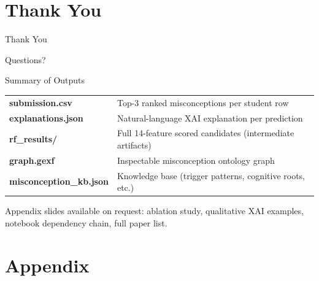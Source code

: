 ﻿\documentclass[aspectratio=169,10pt]{beamer}
\begin{document}
\section{Thank You}
\begin{frame}{Thank You}
\begin{center}
{\Large Questions?}

\vspace{1.2em}

\begin{block}{Summary of Outputs}
\begin{tabular}{ll}
\textbf{submission.csv} & Top-3 ranked misconceptions per student row\\
\textbf{explanations.json} & Natural-language XAI explanation per prediction\\
\textbf{rf\_results/} & Full 14-feature scored candidates (intermediate artifacts)\\
\textbf{graph.gexf} & Inspectable misconception ontology graph\\
\textbf{misconception\_kb.json} & Knowledge base (trigger patterns, cognitive roots, etc.)\\
\end{tabular}
\end{block}

\vspace{1em}
{\small Appendix slides available on request: ablation study, qualitative XAI examples, notebook dependency chain, full paper list.}
\end{center}
\end{frame}

\appendix
\section{Appendix}
\end{document}

